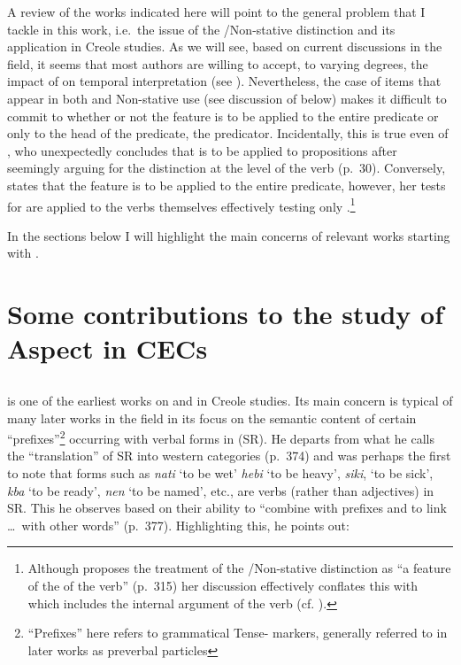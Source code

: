 A review of the works indicated here will point to the general problem
that I tackle in this work, i.e.\ the issue of the \slash Non-stative
distinction and its application in Creole studies.  As we will see,
based on current discussions in the field, it seems that most authors
are willing to accept, to varying degrees, the impact of  on
temporal interpretation (see
\citealt{Gooden2008,Sidnell2002,Winford1993,Winford2000}).  Nevertheless,
the case of items that appear in both  and Non-stative use (see
discussion of \citealt{Jaganauth1987} below) makes it difficult to commit to
whether or not the feature  is to be applied to the entire
predicate or only to the head of the predicate, the predicator.
Incidentally, this is true even of \citet{Bickerton1975}, who
unexpectedly concludes that  is to be applied to propositions
after seemingly arguing for the distinction at the level of the verb
(p.~30).  Conversely, \citet{Gooden2008} states that the feature
 is to be applied to the entire predicate, however, her tests for
 are applied to the verbs themselves effectively testing only
.\footnote{Although \citet{Gooden2008} proposes the
  treatment of the \slash Non-stative distinction as ``a feature of
  the  of the verb” (p.~315) her discussion effectively
  conflates this with  which includes the internal
  argument of the verb (cf. \citealt{Verkuyl1999}).}

In the sections below I will highlight the main concerns of relevant
works starting with \citet{Voorhoeve1957}.

\section{Some contributions to the study of Aspect in
  CECs}\label{sec:2.1}
\subsection{\citet{Voorhoeve1957}}\label{sec:2.1.1}

\citet{Voorhoeve1957} is one of the earliest works on  and 
in Creole studies.  Its main concern is typical of many later works in
the field in its focus on the semantic content of certain
“prefixes”\footnote{``Prefixes'' here refers to grammatical Tense-
  markers, generally referred to in later works as preverbal
  particles} occurring with verbal forms in  (SR).  He departs
from what he calls the ``translation” of SR into western 
categories (p.~374) and was perhaps the first to note that forms such
as \textit{nati} `to be wet' \textit{hebi} `to be heavy',
\textit{siki}, `to be sick', \textit{kba} `to be ready', \textit{nen}
`to be named', etc., are verbs (rather than adjectives) in SR.  This he
observes based on their ability to ``combine with prefixes and to link
\dots\ with other words” (p.~377).  Highlighting this, he points out:

